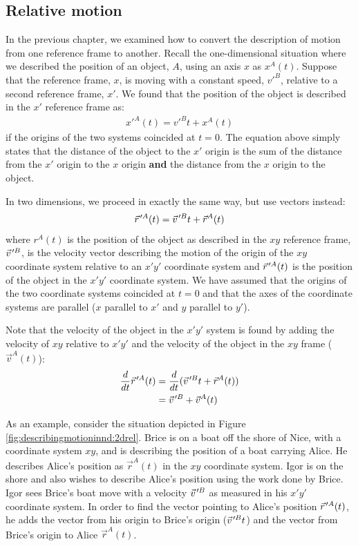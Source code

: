 \subsection{Relative motion}
\label{sec:desribingmotioninnd:relativemotion}
In the previous chapter, we examined how to convert the description of motion from one reference frame to another. Recall the one-dimensional situation where we described the position of an object, $A$, using an axis $x$ as $x^A(t)$. Suppose that the reference frame, $x$, is moving with a constant speed, $v'^B$, relative to a second reference frame, $x'$. We found that the position of the object is described in the $x'$ reference frame as:
\begin{align*}
x'^A(t)=v'^Bt+x^A(t)
\end{align*}
if the origins of the two systems coincided at $t=0$. The equation above simply states that the distance of the object to the $x'$ origin is the sum of the distance from the $x'$ origin to the $x$ origin \textbf{and} the distance from the $x$ origin to the object.

In two dimensions, we proceed in exactly the same way, but use vectors instead:
\begin{align*}
\pvec r'^A(t) = \pvec v'^Bt+\vec r^A(t)
\end{align*}
where $r^A(t)$ is the position of the object as described in the $xy$ reference frame, $\pvec v'^B$, is the velocity vector describing the motion of the origin of the $xy$ coordinate system relative to an $x'y'$ coordinate system and $\pvec r'^A(t)$ is the position of the object in the $x'y'$ coordinate system. We have assumed that the origins of the two coordinate systems coincided at $t=0$ and that the axes of the coordinate systems are parallel ($x$ parallel to $x'$ and $y$ parallel to $y'$).

Note that the velocity of the object in the $x'y'$ system is found by adding the velocity of $xy$ relative to $x'y'$ and the velocity of the object in the $xy$ frame ($\vec v^A(t)$):
\begin{align*}
\frac{d}{dt}\pvec r'^A(t) &=\frac{d}{dt}(\pvec v'^Bt+\vec r^A(t))\\
&=\pvec v'^B+\vec v^A(t)
\end{align*}

As an example, consider the situation depicted in Figure \ref{fig:describingmotioninnd:2drel}. Brice is on a boat off the shore of Nice, with a coordinate system $xy$, and is describing the position of a boat carrying Alice. He describes Alice's position as $\vec r^A(t)$ in the $xy$ coordinate system. Igor is on the shore and also wishes to describe Alice's position using the work done by Brice. Igor sees Brice's boat move with a velocity $\pvec v'^B$ as measured in his $x'y'$ coordinate system. In order to find the vector pointing to Alice's position $\pvec r'^A(t)$, he adds the vector from his origin to Brice's origin ($\pvec v'^B t$) and the vector from Brice's origin to Alice $\vec r^A(t)$.

